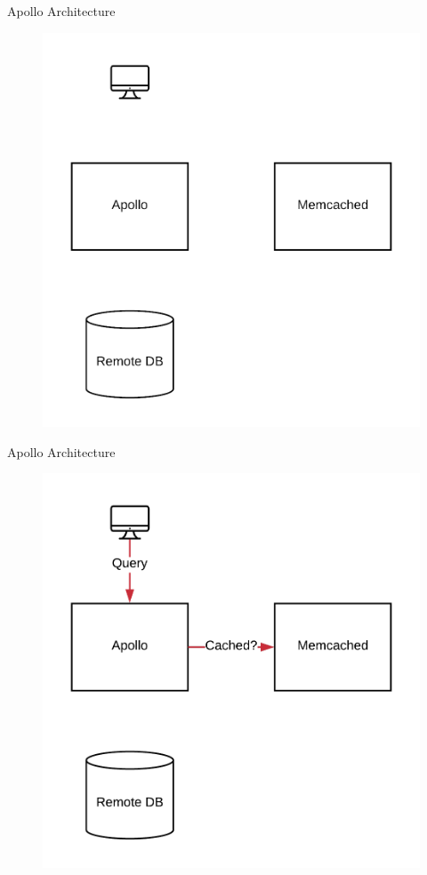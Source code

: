 \documentclass[10pt]{beamer}
\begin{document}
\begin{frame}[fragile]{Apollo Architecture}
    \begin{figure}
        \includegraphics[scale=0.17]{apollo_arch_diagram}
    \end{figure}
\end{frame}

\begin{frame}[fragile]{Apollo Architecture}
    \begin{figure}
        \includegraphics[scale=0.17]{apollo_arch_diagram_2}
    \end{figure}
\end{frame}
\end{document}
